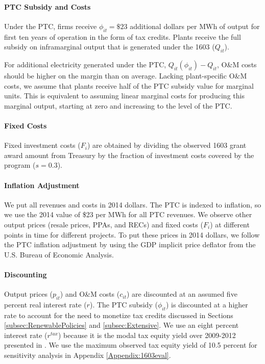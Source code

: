 \documentclass[12pt]{article}
\begin{document}
\paragraph*{PTC Subsidy and Costs}
Under the PTC, firms receive $\phi_{it} = \$23$ additional dollars per MWh of output for first ten years of operation in the form of tax credits. Plants receive the full subsidy on inframarginal output that is generated under the 1603 ($Q_{it}$).

For additional electricity generated under the PTC, $Q_{it}(\phi_{it}) - Q_{it}$, O\&M costs should be higher on the margin than on average. Lacking plant-specific O\&M costs, we assume that plants receive half of the PTC subsidy value for marginal units. This is equivalent to assuming linear marginal costs for producing this marginal output, starting at zero and increasing to the level of the PTC.

\paragraph*{Fixed Costs}
Fixed investment costs ($F_i$) are obtained by dividing the observed 1603 grant award amount from Treasury by the fraction of investment costs covered by the program ($s=0.3$).

\paragraph*{Inflation Adjustment}
We put all revenues and costs in 2014 dollars. The PTC is indexed to inflation, so we use the 2014 value of \$23 per MWh for all PTC revenues. We observe other output prices (resale prices, PPAs, and RECs) and fixed costs ($F_i$) at different points in time for different projects. To put these prices in 2014 dollars, we follow the PTC inflation adjustment by using the GDP implicit price deflator from the U.S. Bureau of Economic Analysis.

\paragraph*{Discounting}
Output prices ($p_{it}$) and O\&M costs ($c_{it}$) are discounted at an assumed five percent real interest rate ($r$). The PTC subsidy ($\phi_{it}$) is discounted at a higher rate to account for the need to monetize tax credits discussed in Sections \ref{subsec:RenewablePolicies} and \ref{subsec:Extensive}. We use an eight percent interest rate ($r^{tax}$) because it is the modal tax equity yield over 2009-2012 presented in \citet{bolinger_analysis_2014}. We use the maximum observed tax equity yield of 10.5 percent for sensitivity analysis in Appendix \ref{Appendix:1603eval}.
\end{document}
